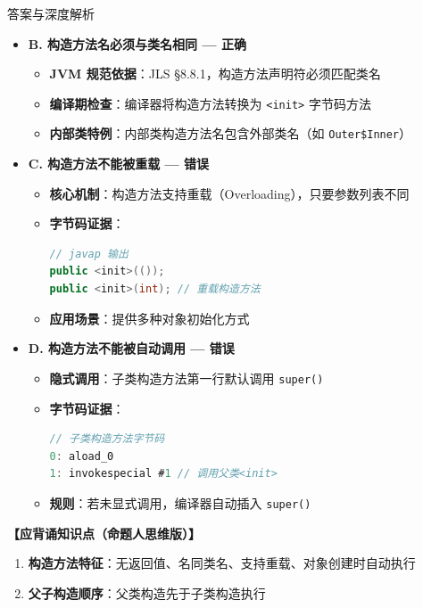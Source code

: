 ﻿\documentclass[12pt, a4paper]{ctexart}
\newcommand{\code}[1]{\texttt{#1}}
\begin{document}
\begin{enumerate}[label=\textbf{\arabic*.}, itemsep=1em]
\begin{bluebox}{答案与深度解析}
\begin{itemize}[leftmargin=*, nosep]
			      \item \textbf{B. 构造方法名必须与类名相同 — 正确}
			            \begin{itemize}[leftmargin=*, nosep]
				            \item \textbf{JVM 规范依据}：JLS §8.8.1，构造方法声明符必须匹配类名
				            \item \textbf{编译期检查}：编译器将构造方法转换为 \code{<init>} 字节码方法
				            \item \textbf{内部类特例}：内部类构造方法名包含外部类名（如 \code{Outer\$Inner}）
			            \end{itemize}

			      \item \textbf{C. 构造方法不能被重载 — 错误}
			            \begin{itemize}[leftmargin=*, nosep]
				            \item \textbf{核心机制}：构造方法支持重载（Overloading），只要参数列表不同
				            \item \textbf{字节码证据}：
				                  \begin{lstlisting}[language=Java]
// javap 输出
public <init>(());
public <init>(int); // 重载构造方法
            \end{lstlisting}
				            \item \textbf{应用场景}：提供多种对象初始化方式
			            \end{itemize}

			      \item \textbf{D. 构造方法不能被自动调用 — 错误}
			            \begin{itemize}[leftmargin=*, nosep]
				            \item \textbf{隐式调用}：子类构造方法第一行默认调用 \code{super()}
				            \item \textbf{字节码证据}：
				                  \begin{lstlisting}[language=Java]
// 子类构造方法字节码
0: aload_0
1: invokespecial #1 // 调用父类<init>
            \end{lstlisting}
				            \item \textbf{规则}：若未显式调用，编译器自动插入 \code{super()}
			            \end{itemize}
		      \end{itemize}

		      \textbf{【应背诵知识点（命题人思维版）】}
		      \begin{enumerate}[leftmargin=*, nosep]
			      \item \textbf{构造方法特征}：无返回值、名同类名、支持重载、对象创建时自动执行
			      \item \textbf{父子构造顺序}：父类构造先于子类构造执行
		      \end{enumerate}


\end{bluebox}
\end{enumerate}
\end{document}

